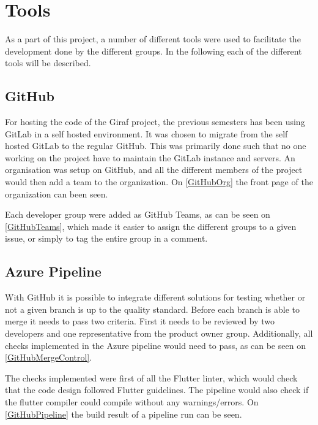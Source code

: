 \section{Tools}
As a part of this project, a number of different tools were used to facilitate the development done by the different groups.
In the following each of the different tools will be described.

\subsection{GitHub}
For hosting the code of the Giraf project, the previous semesters has been using GitLab in a self hosted environment.
It was chosen to migrate from the self hosted GitLab to the regular GitHub.
This was primarily done such that no one working on the project have to maintain the GitLab instance and servers.
An organisation was setup on GitHub, and all the different members of the project would then add a team to the organization. 
On \autoref{GitHubOrg} the front page of the organization can been seen.


Each developer group were added as GitHub Teams, as can be seen on \autoref{GitHubTeams}, which made it easier to assign the different groups to a given issue, or simply to tag the entire group in a comment.


\subsection{Azure Pipeline}
With GitHub it is possible to integrate different solutions for testing whether or not a given branch is up to the quality standard.
Before each branch is able to merge it needs to pass two criteria.
First it needs to be reviewed by two developers and one representative from the product owner group.
Additionally, all checks implemented in the Azure pipeline would need to pass, as can be seen on \autoref{GitHubMergeControl}.


The checks implemented were first of all the Flutter linter, which would check that the code design followed Flutter guidelines.
The pipeline would also check if the flutter compiler could compile without any warnings/errors.
On \autoref{GitHubPipeline} the build result of a pipeline run can be seen.

